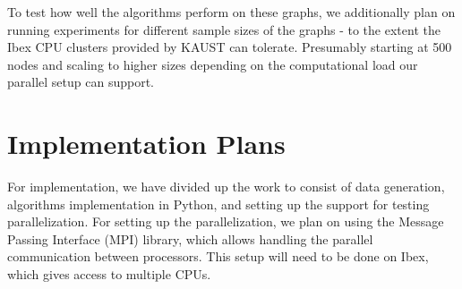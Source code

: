 \documentclass[11pt, a4paper]{article}
\begin{document}
To test how well the algorithms perform on these graphs, we additionally plan on running experiments for different sample sizes of the graphs - to the extent the Ibex CPU clusters provided by KAUST can tolerate. Presumably starting at 500 nodes and scaling to higher sizes depending on the computational load our parallel setup can support.

\section{Implementation Plans}

For implementation, we have divided up the work to consist of data generation, algorithms implementation in Python, and setting up the support for testing parallelization.
For setting up the parallelization, we plan on using the Message Passing Interface (MPI) library, which allows handling the parallel communication between processors. This setup will need to be done on Ibex, which gives access to multiple CPUs.
\end{document}
